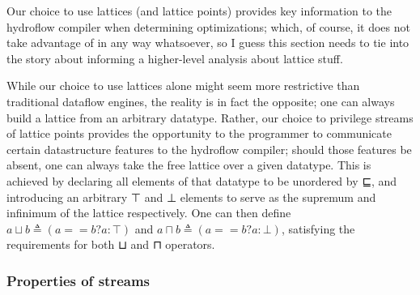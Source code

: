 Our choice to use lattices (and lattice points) provides key
information to the hydroflow compiler when determining optimizations;
which, of course, it does not take advantage of in any way whatsoever,
so I guess this section needs to tie into the story about informing a
higher-level analysis about lattice stuff.

While our choice to use lattices alone might seem more restrictive
than traditional dataflow engines, the reality is in fact the
opposite; one can always build a lattice from an arbitrary datatype.
Rather, our choice to privilege streams of lattice points provides the
opportunity to the programmer to communicate certain datastructure
features to the hydroflow compiler; should those features be absent,
one can always take the free lattice over a given datatype. This is
achieved by declaring all elements of that datatype to be unordered by
⊑, and introducing an arbitrary ⊤ and ⊥ elements to serve as the
supremum and infinimum of the lattice respectively.  One can then
define $a ⊔ b ≜ (a == b ? a : ⊤)$ and $a ⊓ b ≜ (a == b ? a : ⊥)$,
satisfying the requirements for both ⊔ and ⊓ operators.

\subsubsection{Properties of streams}








\endinput
